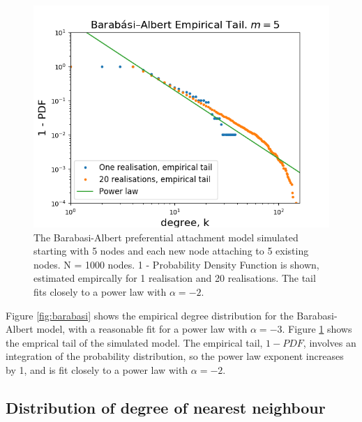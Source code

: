 \documentclass{article}
\begin{document}
\begin{figure}[H]
\includegraphics[scale=0.8]{barabasi_a.png} 
\caption{The Barabasi-Albert preferential attachment model simulated starting with 5 nodes and each new node attaching to 5 existing nodes. N = 1000 nodes. 1 - Probability Density Function is shown, estimated empircally for 1 realisation and 20 realisations. The tail fits closely to a power law with $\alpha=-2$.} 
\label{fig:barabasi_tail}
\end{figure}

Figure \ref{fig:barabasi} shows the empirical degree distribution for the Barabasi-Albert model, with a reasonable fit for a power law with $\alpha=-3$. Figure \ref{fig:barabasi_tail} shows the emprical tail of the simulated model. The empirical tail, $1-PDF$, involves an integration of the probability distribution, so the power law exponent increases by 1, and is fit closely to a power law with $\alpha = -2$.

\subsection{Distribution of degree of nearest neighbour}
\end{document}
